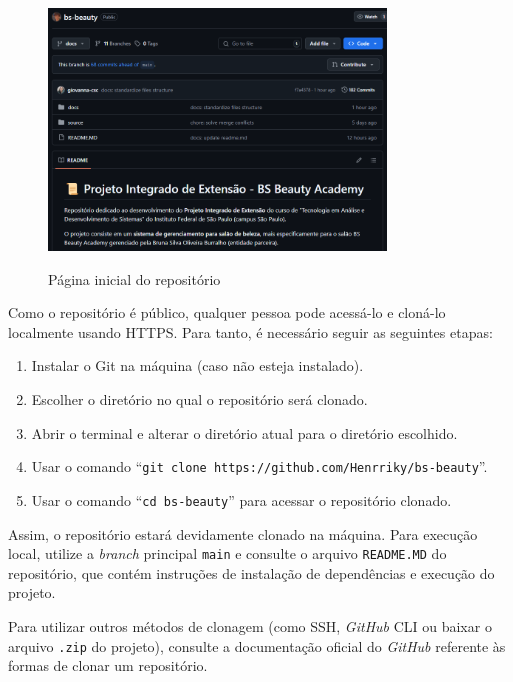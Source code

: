 \begin{figure}[h]
	\centering
	\caption{Página inicial do repositório}
	\includegraphics[width=0.8\textwidth]{cap03-gestao/imagens/bsbeauty-repositorio.png}
	\label{fig:inicio-repositorio}
\end{figure}

Como o repositório é público, qualquer pessoa pode acessá-lo e cloná-lo localmente usando HTTPS. Para tanto, é necessário seguir as seguintes etapas:
 
\begin{enumerate}
	\item Instalar o Git na máquina (caso não esteja instalado).
	\item Escolher o diretório no qual o repositório será clonado.
	\item Abrir o terminal e alterar o diretório atual para o diretório escolhido.
	\item Usar o comando ``\texttt{git clone https://github.com/Henrriky/bs-beauty}''.
	\item Usar o comando ``\texttt{cd bs-beauty}'' para acessar o repositório clonado.
\end{enumerate}

Assim, o repositório estará devidamente clonado na máquina. Para execução local, utilize a \textit{branch} principal \texttt{main} e consulte o arquivo \texttt{README.MD} do repositório, que contém instruções de instalação de dependências e execução do projeto.

Para utilizar outros métodos de clonagem (como SSH, \emph{GitHub} CLI ou baixar o arquivo \texttt{.zip} do projeto), consulte a documentação oficial do \emph{GitHub} \cite{clone-2025} referente às formas de clonar um repositório.